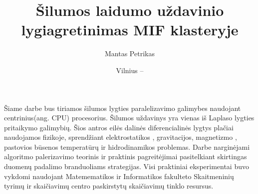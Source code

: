 \documentclass{VUMIFPSbakalaurinis}
\title{Šilumos laidumo uždavinio lygiagretinimas MIF klasteryje}
\author{Mantas Petrikas}
\date{Vilnius – \the\year}
\begin{document}
\maketitle



\tableofcontents





Šiame darbe bus tiriamos šilumos lygties paralelizavimo galimybes naudojant centrinius(ang. CPU) procesorius. 
Šilumos uždavinys yra vienas iš Laplaso lygties pritaikymo galimybių. 
Šios antros eilės dalinės diferencialinės lygtys plačiai naudojamos fizikoje, sprendžiant elektrostatikos \cite{house2008analytic}, gravitacijos, magnetizmo \cite{blakely1996potential}, pastovios būsenos temperatūrų \cite {berntsson2001numerical} ir hidrodinamikos \cite{kadanoff1985simulating} problemas. 
Darbe narginėjami algoritmo palerizavimo teorinis ir praktinis pagreitėjimai pasitelkiant skirtingas duomenų padalimo branduoliams strategijas. 
Visi praktiniai eksperimentai buvo vykdomi naudojant Matemematikos ir Informatikos fakulteto Skaitmeninių tyrimų ir skaičiavimų centro paskirstytų skaičiavimų tinklo resursus.



\end{document}
